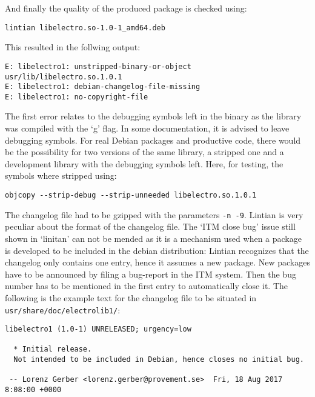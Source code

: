 \documentclass[a4paper,11pt,twoside]{article}
\begin{document}
And finally the quality of the produced package is checked using:
\begin{verbatim}
lintian libelectro.so-1.0-1_amd64.deb
\end{verbatim}

This resulted in the follwing output:
\begin{verbatim}
E: libelectro1: unstripped-binary-or-object usr/lib/libelectro.so.1.0.1
E: libelectro1: debian-changelog-file-missing
E: libelectro1: no-copyright-file
\end{verbatim}

The first error relates to the debugging symbols left in the binary as
the library was compiled with the `g' flag. In some documentation, it is
advised to leave debugging symbols. For real Debian packages and productive
code, there would be the possibility for two versions of the same library,
a stripped one and a development library with the debugging symbols left.
Here, for testing, the symbols where stripped using:

\begin{verbatim}
objcopy --strip-debug --strip-unneeded libelectro.so.1.0.1
\end{verbatim}

The changelog file had to be gzipped with the parameters \verb+-n -9+. Lintian
is very peculiar about the format of the changelog file. The `ITM close bug'
issue still shown in `linitan'  can not be mended as it is a mechanism used
when a package is developed to be included in the debian distribution: Lintian
recognizes that the changelog only contains one entry, hence it assumes a new
package. New packages have to be announced by filing a bug-report in the ITM
system. Then the bug number has to be mentioned in the first entry to automatically
close it. The following is the example text for the changelog file to be situated
in \verb+usr/share/doc/electrolib1/+:
\begin{verbatim}
libelectro1 (1.0-1) UNRELEASED; urgency=low

  * Initial release.
  Not intended to be included in Debian, hence closes no initial bug.

 -- Lorenz Gerber <lorenz.gerber@provement.se>  Fri, 18 Aug 2017 8:08:00 +0000
\end{verbatim}
\end{document}
